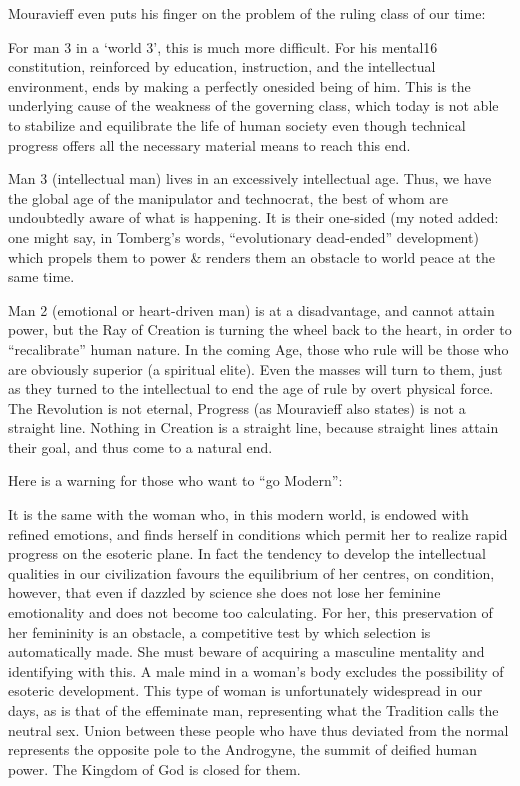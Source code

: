 Mouravieff even puts his finger on the problem of the ruling class of our time:

\begin{quotex}
For man 3 in a `world 3', this is much more difficult. For his mental16 constitution, reinforced by education, instruction, and the intellectual environment, ends by making a perfectly onesided being of him. This is the underlying cause of the weakness of the governing class, which today is not able to stabilize and equilibrate the life of human society even though technical progress offers all the necessary material means to reach this end.
\end{quotex}


\begin{quotex}
Man 3 (intellectual man) lives in an excessively intellectual age. Thus, we have the global age of the manipulator and technocrat, the best of whom are undoubtedly aware of what is happening. It is their one-sided (my noted added: one might say, in Tomberg's words, ``evolutionary dead-ended'' development) which propels them to power \& renders them an obstacle to world peace at the same time.
\end{quotex}


Man 2 (emotional or heart-driven man) is at a disadvantage, and cannot attain power, but the Ray of Creation is turning the wheel back to the heart, in order to ``recalibrate'' human nature. In the coming Age, those who rule will be those who are obviously superior (a spiritual elite). Even the masses will turn to them, just as they turned to the intellectual to end the age of rule by overt physical force. The Revolution is not eternal, Progress (as Mouravieff also states) is not a straight line. Nothing in Creation is a straight line, because straight lines attain their goal, and thus come to a natural end.

Here is a warning for those who want to ``go Modern'':

\begin{quotex}
It is the same with the woman who, in this modern world, is endowed with refined emotions, and finds herself in conditions which permit her to realize rapid progress on the esoteric plane. In fact the tendency to develop the intellectual qualities in our civilization favours the equilibrium of her centres, on condition, however, that even if dazzled by science she does not lose her feminine emotionality and does not become too calculating. For her, this preservation of her femininity is an obstacle, a competitive test by which selection is automatically made. She must beware of acquiring a masculine mentality and identifying with this. A male mind in a woman's body excludes the possibility of esoteric development. This type of woman is unfortunately widespread in our days, as is that of the effeminate man, representing what the Tradition calls the neutral sex. Union between these people who have thus deviated from the normal represents the opposite pole to the Androgyne, the summit of deified human power. The Kingdom of God is closed for them.
\end{quotex}


